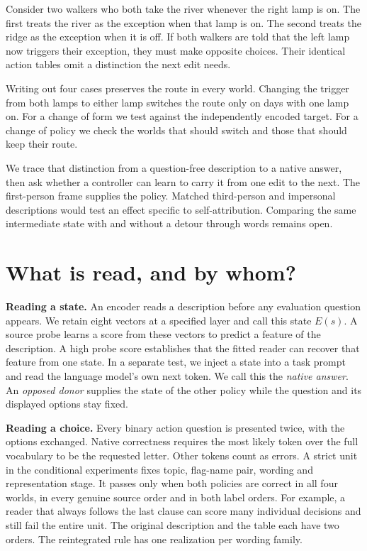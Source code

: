 \documentclass[11pt]{article}
\begin{document}
Consider two walkers who both take the river whenever the right lamp is on. The first treats the river as the exception when that lamp is on. The second treats the ridge as the exception when it is off. If both walkers are told that the left lamp now triggers their exception, they must make opposite choices. Their identical action tables omit a distinction the next edit needs.

Writing out four cases preserves the route in every world. Changing the trigger from both lamps to either lamp switches the route only on days with one lamp on. For a change of form we test against the independently encoded target. For a change of policy we check the worlds that should switch and those that should keep their route.

We trace that distinction from a question-free description to a native answer, then ask whether a controller can learn to carry it from one edit to the next. The first-person frame supplies the policy. Matched third-person and impersonal descriptions would test an effect specific to self-attribution. Comparing the same intermediate state with and without a detour through words remains open.

\section{What is read, and by whom?}

\textbf{Reading a state.} An encoder reads a description before any evaluation question appears. We retain eight vectors at a specified layer and call this state $E(s)$. A source probe learns a score from these vectors to predict a feature of the description. A high probe score establishes that the fitted reader can recover that feature from one state. In a separate test, we inject a state into a task prompt and read the language model's own next token. We call this the \emph{native answer}. An \emph{opposed donor} supplies the state of the other policy while the question and its displayed options stay fixed.

\textbf{Reading a choice.} Every binary action question is presented twice, with the options exchanged. Native correctness requires the most likely token over the full vocabulary to be the requested letter. Other tokens count as errors. A strict unit in the conditional experiments fixes topic, flag-name pair, wording and representation stage. It passes only when both policies are correct in all four worlds, in every genuine source order and in both label orders. For example, a reader that always follows the last clause can score many individual decisions and still fail the entire unit. The original description and the table each have two orders. The reintegrated rule has one realization per wording family.
\end{document}
